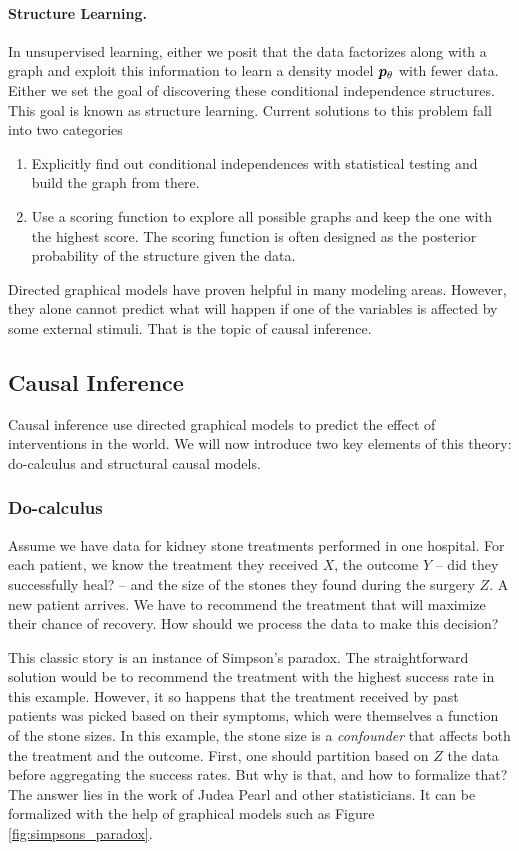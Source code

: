 \paragraph{Structure Learning.}
In unsupervised learning, either we posit that the data factorizes along with a graph and exploit this information to learn a density model $\bm{p}_{\theta}$ with fewer data. Either we set the goal of discovering these conditional independence structures. This goal is known as structure learning. Current solutions to this problem fall into two categories
\begin{enumerate}
	\item Explicitly find out conditional independences with statistical testing and build the graph from there.
	\item Use a scoring function to explore all possible graphs and keep the one with the highest score. The scoring function is often designed as the posterior probability of the structure given the data.
\end{enumerate}

Directed graphical models have proven helpful in many modeling areas. However, they alone cannot predict what will happen if one of the variables is affected by some external stimuli. That is the topic of causal inference.

\subsection{Causal Inference}
\label{ssec:SCM}

Causal inference use directed graphical models to predict the effect of interventions in the world. We will now introduce two key elements of this theory: do-calculus and structural causal models.

\subsubsection{Do-calculus}
Assume we have data for kidney stone treatments performed in one hospital.
For each patient, we know the treatment they received $X$, the outcome $Y$ -- did they successfully heal? -- and the size of the stones they found during the surgery $Z$.
A new patient arrives. We have to recommend the treatment that will maximize their chance of recovery.
How should we process the data to make this decision?

This classic story is an instance of Simpson's paradox.
The straightforward solution would be to recommend the treatment with the highest success rate in this example.
However, it so happens that the treatment received by past patients was picked based on their symptoms, which were themselves a function of the stone sizes.
In this example, the stone size is a \textit{confounder} that affects both the treatment and the outcome.
First, one should partition based on $Z$ the data before aggregating the success rates. But why is that, and how to formalize that? The answer lies in the work of Judea Pearl \citep{pearl2009causality} and other statisticians. It can be formalized with the help of graphical models such as Figure \ref{fig:simpsons_paradox}.

